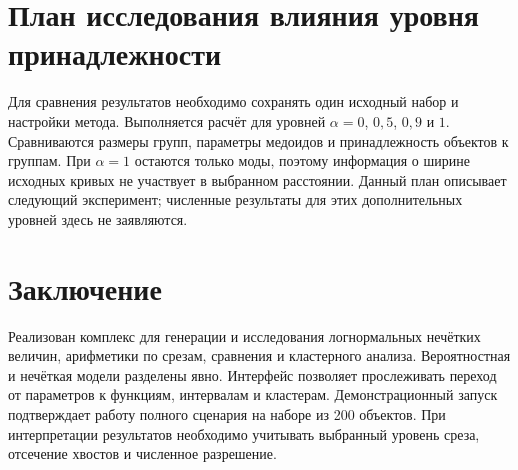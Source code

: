 \documentclass[fontsize=14pt,a4paper]{scrartcl}
\begin{document}
\section{План исследования влияния уровня принадлежности}
Для сравнения результатов необходимо сохранять один исходный набор и настройки метода. Выполняется расчёт для уровней $\alpha=0$, $0{,}5$, $0{,}9$ и $1$. Сравниваются размеры групп, параметры медоидов и принадлежность объектов к группам. При $\alpha=1$ остаются только моды, поэтому информация о ширине исходных кривых не участвует в выбранном расстоянии. Данный план описывает следующий эксперимент; численные результаты для этих дополнительных уровней здесь не заявляются.

\section*{Заключение}
Реализован комплекс для генерации и исследования логнормальных нечётких величин, арифметики по срезам, сравнения и кластерного анализа. Вероятностная и нечёткая модели разделены явно. Интерфейс позволяет прослеживать переход от параметров к функциям, интервалам и кластерам. Демонстрационный запуск подтверждает работу полного сценария на наборе из 200 объектов. При интерпретации результатов необходимо учитывать выбранный уровень среза, отсечение хвостов и численное разрешение.
\end{document}
